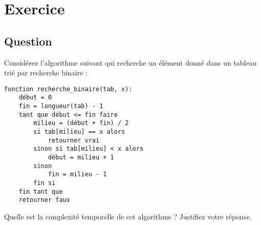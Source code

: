 \documentclass{article}
\begin{document}
\section{Exercice}

\subsection*{Question}
Considérez l'algorithme suivant qui recherche un élément donné dans un tableau trié par recherche binaire :
\begin{verbatim}
fonction recherche_binaire(tab, x):
    début = 0
    fin = longueur(tab) - 1
    tant que début <= fin faire
        milieu = (début + fin) / 2
        si tab[milieu] == x alors
            retourner vrai
        sinon si tab[milieu] < x alors
            début = milieu + 1
        sinon
            fin = milieu - 1
        fin si
    fin tant que
    retourner faux
\end{verbatim}

Quelle est la complexité temporelle de cet algorithme ? Justifiez votre réponse.
\end{document}
